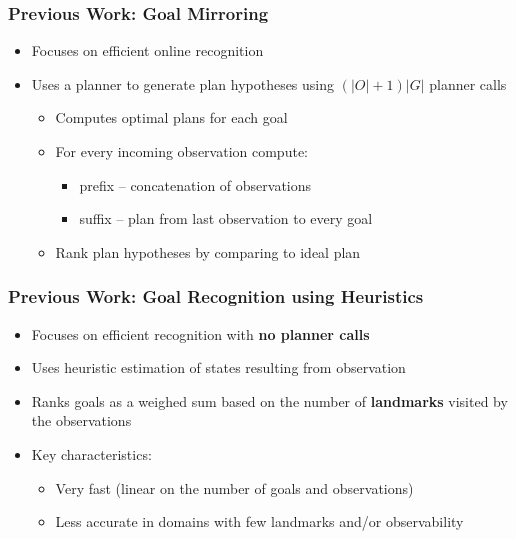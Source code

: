 \documentclass{beamer}
\begin{document}
	\begin{frame}[c]\frametitle{Previous Work: Goal Mirroring}
		\begin{itemize}
			\item Focuses on efficient online recognition
			\item Uses a planner to generate plan hypotheses using $(|O|+1)|G|$ planner calls
			\begin{itemize}
				\item Computes optimal plans for each goal
				\item For every incoming observation compute:
				\begin{itemize}
					\item prefix -- concatenation of observations
					\item suffix -- plan from last observation to every goal
				\end{itemize}
				\item Rank plan hypotheses by comparing to ideal plan
			\end{itemize}
		\end{itemize}
	\end{frame}
	
	\begin{frame}[c]\frametitle{Previous Work: Goal Recognition using Heuristics}
		\begin{itemize}
			\item Focuses on efficient recognition with \textbf{no planner calls}
			\item Uses heuristic estimation of states resulting from observation
			\item Ranks goals as a weighed sum based on the number of \textbf{landmarks} visited by the observations
			\item Key characteristics: 
			\begin{itemize}
				\item Very fast (linear on the number of goals and observations)
				\item Less accurate in domains with few landmarks and/or observability
			\end{itemize}
		\end{itemize}
	\end{frame}
\fi
	
\end{document}
